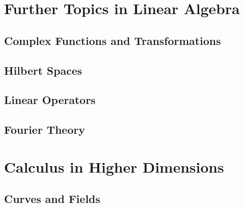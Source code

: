 \documentclass[12pt,letterpaper, openany]{book} %
\begin{document}
 
\frontmatter



%
 
\clearpage
\thispagestyle{empty}
 
\tableofcontents
 
\mainmatter

\setcounter{part}{4}
\part{Further Topics in Linear Algebra}

\chapter{Complex Functions and Transformations}
 

\chapter{Hilbert Spaces}


\chapter{Linear Operators}


\chapter{Fourier Theory}


\part{Calculus in Higher Dimensions}

\chapter{Curves and Fields}

\end{document}
